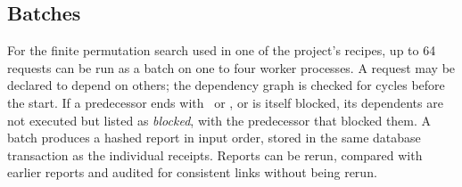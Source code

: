 \subsection{Batches}

For the finite permutation search used in one of the project's recipes, up to 64 requests can be run as a batch on one to four worker
processes. A request may be declared to depend on others; the dependency
graph is checked for cycles before the start. If a predecessor ends with \guard\ or \reject, or is itself blocked, its dependents are
not executed but listed as \emph{blocked}, with the predecessor that blocked them. A batch produces a hashed report in input order,
stored in the same database transaction as the individual receipts. Reports can be rerun, compared with earlier reports and audited for
consistent links without being rerun.
